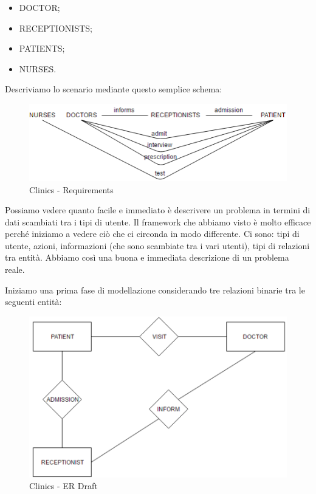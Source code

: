 \begin{itemize}

\item DOCTOR;
\item RECEPTIONISTS;
\item PATIENTS;
\item NURSES.

\end{itemize}

Descriviamo lo scenario mediante questo semplice schema: 

\begin{center}
\begin{figure}[H]
\centering
\includegraphics[scale=1]{figures/clinics_req.png}
\caption{Clinics - Requirements}
\end{figure}
\end{center}

Possiamo vedere quanto facile e immediato è descrivere un problema in termini di dati scambiati tra i tipi di utente. Il framework che abbiamo visto è molto efficace perché iniziamo a vedere ciò che ci circonda in modo differente. Ci sono: tipi di utente, azioni, informazioni (che sono scambiate tra i vari utenti), tipi di relazioni tra entità. Abbiamo così una buona e immediata descrizione di un problema reale. 

Iniziamo una prima fase di modellazione considerando tre relazioni binarie tra le seguenti entità: 

\begin{center}
\begin{figure}[H]
\centering
\includegraphics[scale=1]{figures/clinics_ER.png}
\caption{Clinics - ER Draft}
\end{figure}
\end{center}


